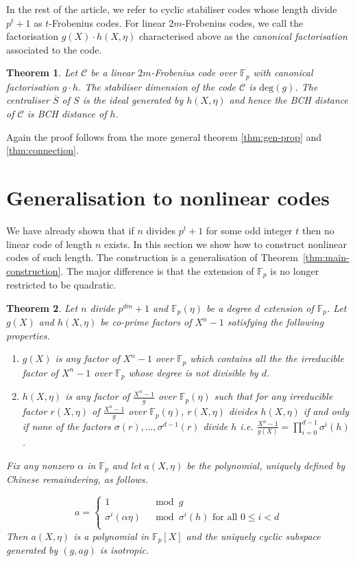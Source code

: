 \documentclass[conference]{IEEEtran}
\renewcommand{\=}{\approx}
\newcommand{\centraliser}[1]{\ensuremath{\overline{#1}}}
\newtheorem{theorem}{Theorem}[section]
\begin{document}
In the rest of the article, we refer to
cyclic stabiliser codes whose length divide $p^{t}+1$ as $t$-Frobenius
codes. For linear $2m$-Frobenius codes, we call the factorisation $g(X) \cdot
h(X,\eta)$ characterised above as the \emph{canonical factorisation}
associated to the code.

\begin{theorem}
  Let $\mathcal{C}$ be a linear $2m$-Frobenius code over
  $\mathbb{F}_p$ with canonical factorisation $g
  \cdot h$. The stabiliser dimension of the code
  $\mathcal{C}$ is $\mathrm{deg}(g)$. The centraliser $\centraliser{S}$
 of $S$ is the ideal generated by $h(X,\eta)$ and hence the BCH distance of
 $\mathcal{C}$ is BCH distance of $h$. 
\end{theorem}
Again the proof follows from the more general theorem \ref{thm:gen-prop} and \ref{thm:connection}.

\section{Generalisation to nonlinear codes}
We have already shown that if $n$ divides $p^t+1$ for some odd integer $t$
 then no linear code of length $n$ exists. In this section we show how to
construct nonlinear codes of such length. The construction is a
generalisation of Theorem~\ref{thm:main-construction}. The major difference
is that the extension of $\mathbb{F}_p$ is no longer restricted
to be quadratic. 

\begin{theorem}\label{thm:gen-const}
  Let $n$ divide $p^{dm}+1$ and $\mathbb{F}_p(\eta)$ be a degree $d$
  extension of $\mathbb{F}_p$. Let $g(X)$ and $h(X,\eta)$ be co-prime factors
  of $X^n-1$ satisfying the following properties.
  \begin{enumerate}
  \item $g(X)$ is any factor of $X^n-1$ over $\mathbb{F}_p$ which
    contains all the the irreducible factor of $X^n-1$ over
    $\mathbb{F}_p$ whose degree is not divisible by $d$.
  \item $h(X,\eta)$ is any factor of $\frac{X^n-1}{g}$ over
    $\mathbb{F}_p(\eta)$ such that for any irreducible factor
    $r(X,\eta)$ of $\frac{X^n-1}{g}$ over $\mathbb{F}_p(\eta)$,
    $r(X,\eta)$ divides $h(X,\eta)$ if and only if none of the factors
    $\sigma(r),\ldots,\sigma^{d-1}(r)$ divide $h$
    i.e. $\frac{X^n-1}{g(X)}=\prod_{i=0}^{d-1}\sigma^i(h)$.
  \end{enumerate}
  Fix any nonzero $\alpha$ in $\mathbb{F}_p$ and let $a(X,\eta)$ be
  the polynomial, uniquely defined by Chinese remaindering, as
  follows.

  \[
  a = \left\{\begin{array}{ll}
  1 & \mod g \\
  \sigma^i(\alpha\eta) & \mod \sigma^i(h) \mbox{ for all } 0\leq i <d \\
  \end{array}\right.
  \]
  Then $a(X,\eta)$ is a polynomial in $\mathbb{F}_p[X]$ and the
  uniquely cyclic subspace generated by $(g,ag)$ is isotropic.
\end{theorem}
\end{document}
